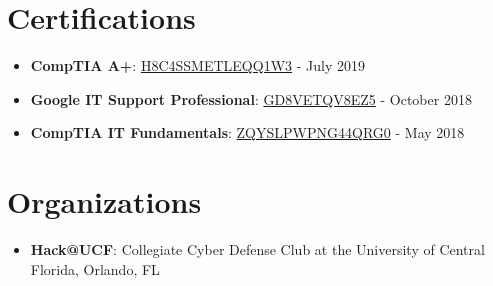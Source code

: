 \documentclass[letterpaper,11pt]{article}
\newcommand{\resumeItem}[2]{
  \item\small{
    \textbf{#1}{: #2 \vspace{-2pt}}
  }
}
\newcommand{\resumeSubItem}[2]{\resumeItem{#1}{#2}\vspace{-4pt}}
\newcommand{\resumeSubHeadingListStart}{\begin{itemize}[leftmargin=*]}
\newcommand{\resumeSubHeadingListEnd}{\end{itemize}}
\begin{document}
\section{Certifications}
  \resumeSubHeadingListStart
    \resumeSubItem{CompTIA A+}
      {\href{https://www.certmetrics.com/comptia/public/verification.aspx?code=H8C4SSMETLEQQ1W3}{H8C4SSMETLEQQ1W3}} - {{July 2019}}
    \resumeSubItem{Google IT Support Professional}
      {\href{https://www.coursera.org/account/accomplishments/professional-cert/certificate/GD8VETQV8EZ5}{GD8VETQV8EZ5}} - {{October 2018}}
    \resumeSubItem{CompTIA IT Fundamentals}
      {\href{https://www.certmetrics.com/comptia/public/verification.aspx?code=ZQYSLPWPNG44QRG0}{ZQYSLPWPNG44QRG0}} - {{May 2018}}
  \resumeSubHeadingListEnd

\section{Organizations}
  \resumeSubHeadingListStart
    \resumeSubItem{Hack@UCF}
      {Collegiate Cyber Defense Club at the University of Central Florida, Orlando, FL}
  \resumeSubHeadingListEnd

\end{document}
